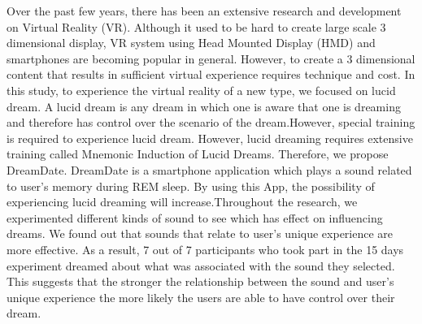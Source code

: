 \begin{eabstract}
Over the past few years, there has been an extensive research and development on Virtual Reality (VR). Although it used to be hard to create large scale 3 dimensional display, VR system using Head Mounted Display (HMD) and smartphones are becoming popular in general. However, to create a 3 dimensional content that results in sufficient virtual experience requires technique and cost. In this study, to experience the virtual reality of a new type, we focused on lucid dream.  A lucid dream is any dream in which one is aware that one is dreaming and therefore has control over the scenario of the dream.However, special training is required to experience lucid dream.  However, lucid dreaming requires extensive training called Mnemonic Induction of Lucid Dreams. Therefore, we propose DreamDate. DreamDate is a smartphone application which plays a sound related to user's memory during REM sleep. By using this App, the possibility of experiencing lucid dreaming will increase.Throughout the research, we experimented different kinds of sound to see which has effect on influencing dreams. We found out that sounds that relate to user's unique experience are more effective. As a result, 7 out of 7 participants who took part in the 15 days experiment dreamed about what was associated with the sound they selected. This suggests that the stronger the relationship between the sound and user's unique experience the more likely the users are able to have control over their dream.
\end{eabstract}
